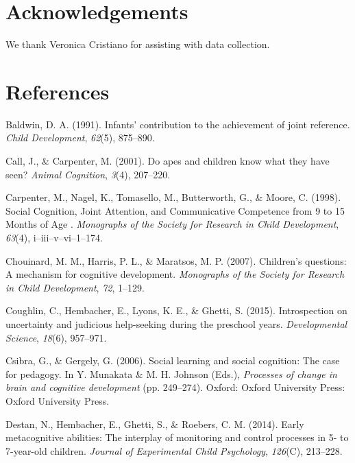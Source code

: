 \documentclass[10pt, letterpaper]{article}
\begin{document}
\section{Acknowledgements}\label{acknowledgements}

We thank Veronica Cristiano for assisting with data collection.

\section{References}\label{references}

\setlength{\parindent}{-0.1in} \setlength{\leftskip}{0.125in} \noindent

\hypertarget{refs}{}
\hypertarget{ref-Baldwin1991}{}
Baldwin, D. A. (1991). Infants' contribution to the achievement of joint
reference. \emph{Child Development}, \emph{62}(5), 875--890.

\hypertarget{ref-Call2001}{}
Call, J., \& Carpenter, M. (2001). Do apes and children know what they
have seen? \emph{Animal Cognition}, \emph{3}(4), 207--220.

\hypertarget{ref-Carpenter1998}{}
Carpenter, M., Nagel, K., Tomasello, M., Butterworth, G., \& Moore, C.
(1998). Social Cognition, Joint Attention, and Communicative Competence
from 9 to 15 Months of Age . \emph{Monographs of the Society for
Research in Child Development}, \emph{63}(4), i--iii--v--vi--1--174.

\hypertarget{ref-Chouinard2007}{}
Chouinard, M. M., Harris, P. L., \& Maratsos, M. P. (2007). Children's
questions: A mechanism for cognitive development. \emph{Monographs of
the Society for Research in Child Development}, \emph{72}, 1--129.

\hypertarget{ref-Coughlin2015}{}
Coughlin, C., Hembacher, E., Lyons, K. E., \& Ghetti, S. (2015).
Introspection on uncertainty and judicious help-seeking during the
preschool years. \emph{Developmental Science}, \emph{18}(6), 957--971.

\hypertarget{ref-Csibra2006}{}
Csibra, G., \& Gergely, G. (2006). Social learning and social cognition:
The case for pedagogy. In Y. Munakata \& M. H. Johnson (Eds.),
\emph{Processes of change in brain and cognitive development} (pp.
249--274). Oxford: Oxford University Press: Oxford University Press.

\hypertarget{ref-Destan2014}{}
Destan, N., Hembacher, E., Ghetti, S., \& Roebers, C. M. (2014). Early
metacognitive abilities: The interplay of monitoring and control
processes in 5- to 7-year-old children. \emph{Journal of Experimental
Child Psychology}, \emph{126}(C), 213--228.
\end{document}
